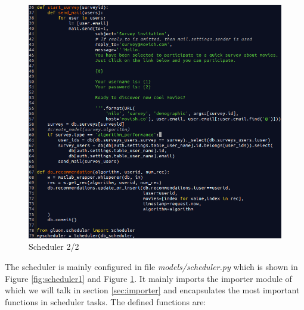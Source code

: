 \begin{figure}
  \centering
  \includegraphics[width=\textwidth]{figures/scheduler2.png}
  \caption{Scheduler 2/2}
  \label{fig:scheduler2}
\end{figure}

The scheduler is mainly configured in file \textit{models/scheduler.py} which is shown in Figure \ref{fig:scheduler1} and Figure \ref{fig:scheduler2}. It mainly imports the importer module of which we will talk in section \ref{sec:importer} and encapsulates the most important functions in scheduler tasks.
The defined functions are:

